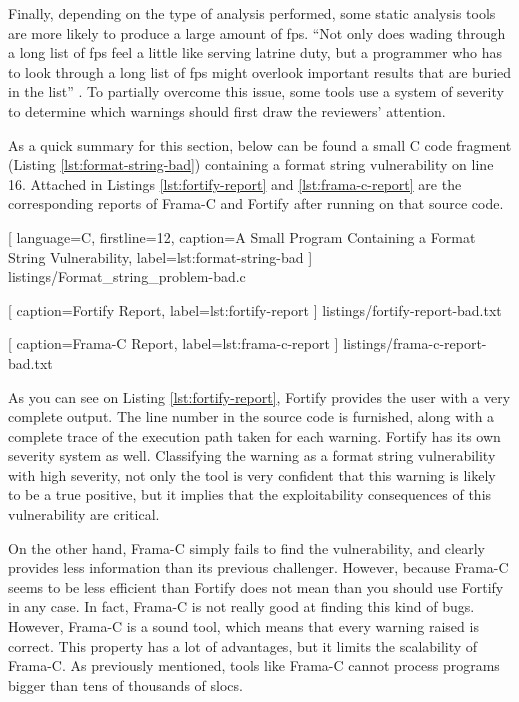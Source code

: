 Finally, depending on the type of analysis performed, some static analysis tools are more likely to produce a large amount of \glspl{fp}. ``Not only does wading through a long list of \glspl{fp} feel a little like serving latrine duty, but a programmer who has to look through a long list of \glspl{fp} might overlook important results that are buried in the list'' \cite{chess2007secure}. To partially overcome this issue, some tools use a system of severity to determine which warnings should first draw the reviewers' attention.

As a quick summary for this section, below can be found a small C code fragment (Listing \ref{lst:format-string-bad}) containing a format string vulnerability on line 16. Attached in Listings \ref{lst:fortify-report} and \ref{lst:frama-c-report} are the corresponding reports of Frama-C and Fortify after running on that source code.

\vfill


    [
        language=C,
        firstline=12,
        caption=A Small Program Containing a Format String Vulnerability,
        label=lst:format-string-bad
    ]
    {listings/Format_string_problem-bad.c}
    
\vfill


    [
        caption=Fortify Report,
        label=lst:fortify-report
    ]
    {listings/fortify-report-bad.txt}
    
\vfill
    

    [
        caption=Frama-C Report,
        label=lst:frama-c-report
    ]
    {listings/frama-c-report-bad.txt}
    
As you can see on Listing \ref{lst:fortify-report}, Fortify provides the user with a very complete output. The line number in the source code is furnished, along with a complete trace of the execution path taken for each warning. Fortify has its own severity system as well. Classifying the warning as a format string vulnerability with high severity, not only the tool is very confident that this warning is likely to be a true positive, but it implies that the exploitability consequences of this vulnerability are critical.

On the other hand, Frama-C simply fails to find the vulnerability, and clearly provides less information than its previous challenger. However, because Frama-C seems to be less efficient than Fortify does not mean than you should use Fortify in any case. In fact, Frama-C is not really good at finding this kind of bugs. However, Frama-C is a sound tool, which means that every warning raised is correct. This property has a lot of advantages, but it limits the scalability of Frama-C. As previously mentioned, tools like Frama-C cannot process programs bigger than tens of thousands of \glspl{sloc}.